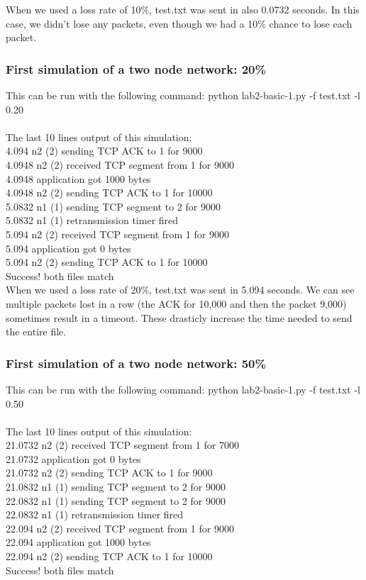 \documentclass[fleqn,11pt]{article}
\begin{document}
When we used a loss rate of 10\%, test.txt was sent in also 0.0732 seconds. In this case, we didn't lose any packets, even though we had a 10\% chance to lose each packet.

\subsubsection{First simulation of a two node network: 20\%}
This can be run with the following command: python lab2-basic-1.py -f test.txt -l 0.20\\ \\
The last 10 lines output of this simulation:\\
4.094 n2 (2) sending TCP ACK to 1 for 9000\\
4.0948 n2 (2) received TCP segment from 1 for 9000\\
4.0948 application got 1000 bytes\\
4.0948 n2 (2) sending TCP ACK to 1 for 10000\\
5.0832 n1 (1) sending TCP segment to 2 for 9000\\
5.0832 n1 (1) retransmission timer fired\\
5.094 n2 (2) received TCP segment from 1 for 9000\\
5.094 application got 0 bytes\\
5.094 n2 (2) sending TCP ACK to 1 for 10000\\
Success! both files match\\

When we used a loss rate of 20\%, test.txt was sent in 5.094 seconds. We can see multiple packets lost in a row (the ACK for 10,000 and then the packet 9,000) sometimes result in a timeout. These drasticly increase the time needed to send the entire file.

\subsubsection{First simulation of a two node network: 50\%}
This can be run with the following command: python lab2-basic-1.py -f test.txt -l 0.50\\\\
The last 10 lines output of this simulation:\\
21.0732 n2 (2) received TCP segment from 1 for 7000\\
21.0732 application got 0 bytes\\
21.0732 n2 (2) sending TCP ACK to 1 for 9000\\
21.0832 n1 (1) sending TCP segment to 2 for 9000\\
22.0832 n1 (1) sending TCP segment to 2 for 9000\\
22.0832 n1 (1) retransmission timer fired\\
22.094 n2 (2) received TCP segment from 1 for 9000\\
22.094 application got 1000 bytes\\
22.094 n2 (2) sending TCP ACK to 1 for 10000\\
Success! both files match\\
\end{document}
